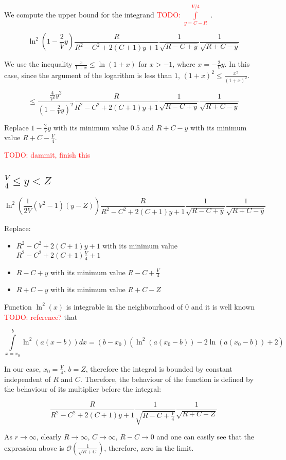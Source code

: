 \documentclass[12pt, a4paper]{article}
\newcommand{\mcO}{\mathcal{O}}
\newcommand{\todo}[1]{{\large \textcolor{red}{TODO: #1}}}
\begin{document}
We compute the upper bound for the integrand \todo{$\int\limits_{y = C - R }^{V/4}$ }.

\[
\ln^2 (1 - \frac{2}{V} y) \frac{R}{R^2 - C^2 + 2 (C + 1) y + 1} \frac{1}{\sqrt{R - C + y}} \frac{1}{\sqrt{R + C - y}}
\]

We use the inequality $\frac{x}{1 + x} \le \ln (1 + x)$ for $x > -1$, where $x = -\frac{2}{V} y$. In this case, since the argument of the logarithm is less than $1$, $(1 + x)^2 \le \frac{x^2}{(1 + x)^2}$.

\[
\le \frac{\frac{4}{V^2}y^2}{(1 - \frac{2}{V}y)^2} \frac{R}{R^2 - C^2 + 2 (C + 1) y + 1} \frac{1}{\sqrt{R - C + y}} \frac{1}{\sqrt{R + C - y}}
\]

Replace $1 - \frac{2}{V}y$ with its minimum value $0.5$ and $R + C - y$ with its minimum value $R + C - \frac{V}{4}$.

\todo{dammit, finish this}

\subsection*{$\frac{V}{4} \le y < Z$}

\[
\ln^2 \left( \frac{1}{2 V}(V^2 - 1) (y - Z) \right) \frac{R}{R^2 - C^2 + 2 (C + 1) y + 1} \frac{1}{\sqrt{R - C + y}} \frac{1}{\sqrt{R + C - y}}
\]

Replace:
\begin{itemize}
\item $R^2 - C^2 + 2 (C + 1) y + 1$ with its minimum value $R^2 - C^2 + 2 (C + 1) \frac{V}{4} + 1$
\item $R - C + y$ with its minimum value $R - C + \frac{V}{4}$
\item $R + C - y$ with its minimum value $R + C - Z$
\end{itemize}

Function $\ln^2(x)$ is integrable in the neighbourhood of $0$ and it is well known \todo{reference?} that

\[
\int\limits_{x=x_0}^b \ln^2(a (x - b)) dx = (b - x_0) (\ln^2(a (x_0 - b)) - 2 \ln(a (x_0 - b)) + 2)
\]

In our case, $x_0 = \frac{V}{4}$, $b = Z$, therefore the integral is bounded by constant independent of $R$ and $C$. Therefore, the behaviour of the function is defined by the behaviour of its multiplier before the integral:

\[
\frac{R}{R^2 - C^2 + 2 (C + 1) y + 1} \frac{1}{\sqrt{R - C + \frac{V}{4}}} \frac{1}{\sqrt{R + C - Z}}
\]

As $r \to \infty$, clearly $R \to \infty$, $C \to \infty$, $R - C \to 0$ and one can easily see that the expression above is $\mcO(\frac{1}{\sqrt{R + C}})$, therefore, zero in the limit.
\end{document}
